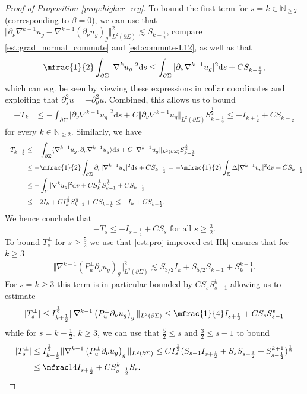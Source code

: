 \documentclass[10pt,reqno]{amsart}
\theoremstyle{plain}
\theoremstyle{definition}
\newcommand{\ptheta}{\partial_\theta}
\newcommand{\pnu}{\partial_\nu}
\numberwithin{equation}{section}
\newcommand{\Si}{\Sigma}
\newcommand{\N}{\ensuremath{{\mathbb N}}}
\newcommand{\norm}[1]{\Vert#1\Vert}
\newcommand{\beq}{\begin{equation}}
\newcommand{\eeq}{\end{equation}}
\newcommand{\beqa}{\begin{equation}\begin{aligned}}
\newcommand{\eeqa}{\end{aligned}\end{equation}}
\newcommand{\beqas}{\begin{equation*}\begin{aligned}}
\newcommand{\eeqas}{\end{aligned}\end{equation*}}
\newcommand{\half}{\frac{1}{2}}
\newcommand{\mhalf}{\mfrac{1}{2}}
\newcommand{\dd}{\mathrm{d}} %
\newcommand{\leqs}{\lesssim}
\newcommand{\ps}{\partial_s}
\newcommand{\abs}[1]{\vert#1\vert}
\newcommand{\na}{\nabla}
\newcommand{\pSi}{{\partial \Sigma}}
\newcommand{\hf}{\frac{1}{2}} %
\newcommand{\p}{\partial} %
\newcommand{\inner}[2]{\langle #1, #2\rangle} %
\begin{document}
\begin{proof}[Proof of Proposition \ref{prop:higher_reg}]
    To bound the first term for $s=k\in \N_{\geq 2}$ (corresponding to $\beta=0$), we can use that $\norm{\pnu\na^{k-1}u_g - \na^{k-1}(\p_\nu u_g)_g}_{L^2(\pSi)}^2 \leqs S_{k-\half}$, compare \eqref{est:grad_normal_commute} and \eqref{est:commute-L12}, as well as that 
    $$\mhalf \int_{\p\Si}\abs{\nabla^{k} u_g}^2\dd s\leq  \int_{\p\Si}\abs{\p_\nu\nabla^{k-1}  u_g}^2\dd s+C S_{k-\half},$$
    which can e.g. be seen by viewing these expressions in collar coordinates and exploiting that $\ps^2 u=-\ptheta^2 u$. Combined, this allows us to bound 
    \beqas
        -T_k &\leq -\int_{\p\Si}\abs{\p_\nu\nabla^{k-1}  u_g}^2\dd s+C\norm{\p_\nu\na^{k-1} u_g}_{L^2(\pSi)} S_{k-\half}^\hf \leq - I_{k+\half}+ C S_{k-\half}
    \eeqas
    for every $k\in \N_{\geq 2}$. Similarly, we have
    \begin{align*}
        -T_{k-\half}&\leq -\int_{\p\Si}\inner{\nabla^{k-1} u_g}{\p_\nu\nabla^{k-1} u_g}\dd s + C\norm{\na^{k-1} u_g}_{L^2(\pSi)} S_{k-\half}^\half\\
        &\leq  - \mhalf\int_{\p\Si}\p_\nu\abs{\nabla^{k-1} u_g}^2\dd s + C S_{k-\half} = -\mhalf\int_{\Si}\Delta\abs{\nabla^{k-1}u_g}^2\dd v + C S_{k-\hf}\\
        &\leq -\int_{\Si}\abs{\nabla^{k}u_g}^2\dd v + C S_k^\half S_{k-1}^\half + C S_{k-\half}\\
        &\leq- 2 I_{k} + CI_{k}^\half S_{k-1}^\half+CS_{k-\half}\leq -  I_{k} + C S_{k-\half}. 
	\end{align*}
    We hence conclude that 
    \beq\label{est:Ts} 
        -T_s\leq - I_{s+\half}+C S_{s} \text{ for all } s\geq \tfrac32.
    \eeq
    To bound $T_s^\perp$ for $s\geq \frac52$ we use that  \eqref{est:proj-improved-est-Hk} ensures that for $k\geq 3$ 
    \beqas 
        \norm{\nabla^{k-1}\left(P_u^\perp\p_\nu u_g\right)_g}_{L^2(\pSi)}^2\leqs S_{3/2}I_k+S_{5/2} S_{k-1}+S_{k-1}^{k+1}.
    \eeqas
    For $s=k\geq 3$ this term is in particular bounded by $CS_{s} S_{s-1}^k$ allowing us to estimate 
    $$\abs{T_s^\perp}\leq I_{k+\half}^\half \norm{\nabla^{k-1}\left(P_u^\perp\p_\nu u_g\right)_g}_{L^2(\pSi)}\leq \mfrac{1}{4} I_{s+\half}+C S_{s} S_{s-1}^s$$
    while for $s=k-\half$, $k\geq 3$, we can use that $\frac52\leq s$ and $\frac32\leq s-1$ to bound 
    \beqa
        \abs{T_s^\perp} &\leq I_{k-\half}^\half \norm{\nabla^{k-1}\left(P_u^\perp\p_\nu u_g\right)_g}_{L^2(\pSi)} \leq C  I_{s}^\half (S_{s-1} I_{s+\hf} +S_{s} S_{s-\hf} +S_{s-\hf}^{k+1})^\half\\
        &\leq \mfrac14 I_{s+\half} +C S_{s-\half}^k S_s.
    \eeqa 
    

\end{proof}
\end{document}
